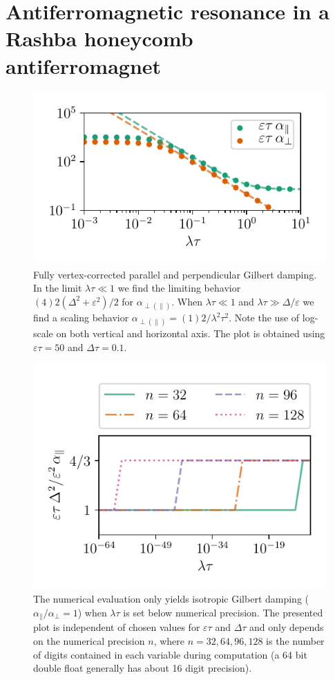 \chapter{Antiferromagnetic resonance in a Rashba honeycomb antiferromagnet} %
\begin{figure}
    \centering
    \includegraphics[width=0.75\linewidth]{gfx/alpha_full}
    \caption{Fully vertex-corrected parallel and perpendicular Gilbert damping. In the limit $\lambda\tau\ll1$ we find the limiting behavior $(4)2(\Delta^2+\varepsilon^2)/2$ for $\alpha_{\perp(\parallel)}$. When $\lambda\tau\ll 1$ and $\lambda\tau\gg\Delta/\varepsilon$ we find a scaling behavior $\alpha_{\perp(\parallel)}=(1)2/\lambda^2\tau^2$. Note the use of log-scale on both vertical and horizontal axis. The plot is obtained using $\varepsilon\tau=50$ and $\Delta\tau=0.1$. }
    \label{fig:alpha_plot}
\end{figure}

\begin{figure}
    \centering
    \includegraphics[width=0.75\linewidth]{gfx/numerical_test}
    \caption{The numerical evaluation only yields isotropic Gilbert damping ($\alpha_{\parallel}/\alpha_{\perp}=1$) when $\lambda\tau$ is set below numerical precision. The presented plot is independent of chosen values for $\varepsilon\tau$ and $\Delta\tau$ and only depends on the numerical precision $n$, where $n=32,64,96,128$ is the number of digits contained in each variable during computation (a 64 bit double float generally has about 16 digit precision). }
    \label{fig:alpha_plot}
\end{figure}

